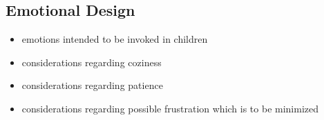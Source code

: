 \subsection{Emotional Design}

\begin{itemize}
    \item emotions intended to be invoked in children
    \item considerations regarding coziness
    \item considerations regarding patience
    \item considerations regarding possible frustration which is to be minimized
\end{itemize}
